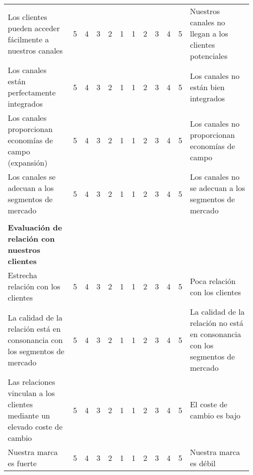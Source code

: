\documentclass[11pt]{book}
\begin{document}
\begin{table}[htbp]
\begin{tabular}{lccccc|cccccl}
    \multicolumn{1}{p{14.285em}}{Los clientes pueden acceder fácilmente a nuestros canales} & 5     & 4     & 3     & 2     & 1     & 1     & 2     & 3     & 4     & 5     & \multicolumn{1}{p{12em}}{Nuestros canales no llegan a los clientes potenciales} \\
    \multicolumn{1}{p{14.285em}}{Los canales están perfectamente integrados} & 5     & 4     & 3     & 2     & 1     & 1     & 2     & 3     & 4     & 5     & \multicolumn{1}{p{12em}}{Los canales no están bien integrados} \\
    \multicolumn{1}{p{14.285em}}{Los canales proporcionan economías de campo (expansión)} & 5     & 4     & 3     & 2     & 1     & 1     & 2     & 3     & 4     & 5     & \multicolumn{1}{p{12em}}{Los canales no proporcionan economías de campo} \\
    \multicolumn{1}{p{14.285em}}{Los canales se adecuan a los segmentos de mercado} & 5     & 4     & 3     & 2     & 1     & 1     & 2     & 3     & 4     & 5     & \multicolumn{1}{p{12em}}{Los canales no se adecuan a los segmentos de mercado} \\
          &       &       &       &       & \multicolumn{1}{c}{} &       &       &       &       &       &  \\
    \multicolumn{1}{p{14.285em}}{\textbf{Evaluación de relación con nuestros clientes}} &       &       &       &       & \multicolumn{1}{c}{} &       &       &       &       &       &  \\
    Estrecha relación con los clientes & 5     & 4     & 3     & 2     & 1     & 1     & 2     & 3     & 4     & 5     & Poca relación con los clientes \\
    \multicolumn{1}{p{14.285em}}{La calidad de la relación está en consonancia con los segmentos de mercado} & 5     & 4     & 3     & 2     & 1     & 1     & 2     & 3     & 4     & 5     & \multicolumn{1}{p{12em}}{La calidad de la relación no está en consonancia con los segmentos de mercado} \\
    \multicolumn{1}{p{14.285em}}{Las relaciones vinculan a los clientes mediante un elevado coste de cambio} & 5     & 4     & 3     & 2     & 1     & 1     & 2     & 3     & 4     & 5     & El coste de cambio es bajo \\
    Nuestra marca es fuerte & 5     & 4     & 3     & 2     & 1     & 1     & 2     & 3     & 4     & 5     & Nuestra marca es débil \\
    \end{tabular}%
  \label{tab:addlabel}%
\end{table}%
\end{document}
